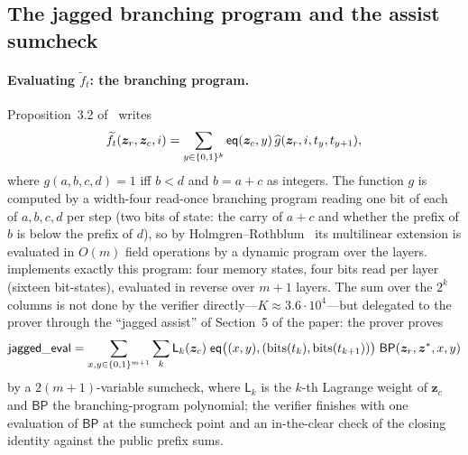 \subsection{The jagged branching program and the assist sumcheck}
\label{sec:app-jagged}

\paragraph{Evaluating $\widetilde f_t$: the branching program.} Proposition~3.2 of~\citep{jagged-pcs} writes
\[
  \widetilde f_t(\bm z_r, \bm z_c, i) = \sum_{y \in \{0,1\}^{k}} \mathsf{eq}(\bm z_c, y)\, \widehat g(\bm z_r, i, t_{y}, t_{y+1}),
\]
where $g(a, b, c, d) = 1$ iff $b < d$ and $b = a + c$ as integers. The function $g$ is computed by a width-four read-once branching program reading one bit of each of $a, b, c, d$ per step (two bits of state: the carry of $a + c$ and whether the prefix of $b$ is below the prefix of $d$), so by Holmgren--Rothblum~\citep{hr18} its multilinear extension is evaluated in $O(m)$ field operations by a dynamic program over the layers. \Zirenver{} implements exactly this program: four memory states, four bits read per layer (sixteen bit-states), evaluated in reverse over $m + 1$ layers. The sum over the $2^k$ columns is not done by the verifier directly---$K \approx 3.6 \cdot 10^4$---but delegated to the prover through the ``jagged assist'' of Section~5 of the paper: the prover proves
\[
  \mathsf{jagged\_eval} = \sum_{x, y \in \{0,1\}^{m+1}} \sum_{k} \mathsf{L}_k(\bm z_c)\; \mathsf{eq}\big((x, y), (\mathrm{bits}(t_k), \mathrm{bits}(t_{k+1}))\big)\; \mathsf{BP}(\bm z_r, \bm z^{*}, x, y)
\]
by a $2(m+1)$-variable sumcheck, where $\mathsf L_k$ is the $k$-th Lagrange weight of $\bm z_c$ and $\mathsf{BP}$ the branching-program polynomial; the verifier finishes with one evaluation of $\mathsf{BP}$ at the sumcheck point and an in-the-clear check of the closing identity against the public prefix sums.

